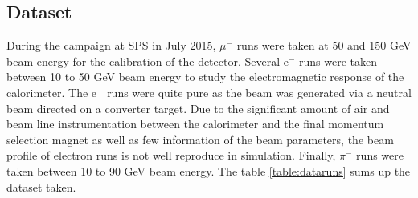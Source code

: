 \documentclass[twoside,a4paper,11pt]{article}
\begin{document}
\subsection{Dataset}
\label{subsec:dataset}
During the campaign at SPS in July 2015, $\mu^-$ runs were taken at 50 and 150 GeV beam energy for the calibration of the detector. Several e$^{-}$ runs were taken between 10 to 50 GeV beam energy to study the electromagnetic response of the calorimeter. The e$^{-}$ runs were quite pure as the beam was generated via a neutral beam directed on a converter target. Due to the significant amount of air and beam line instrumentation between the calorimeter and the final momentum selection magnet as well as few information of the beam parameters, the beam profile of electron runs is not well reproduce in simulation. Finally, $\pi^-$ runs were taken between 10 to 90 GeV beam energy. The table \ref{table:dataruns} sums up the dataset taken.
\begin{table}[htbp]
\centering
{}
  \caption{List of runs taken at SPS in July 2015.}
  \label{table:dataruns}
\end{table}
\end{document}
